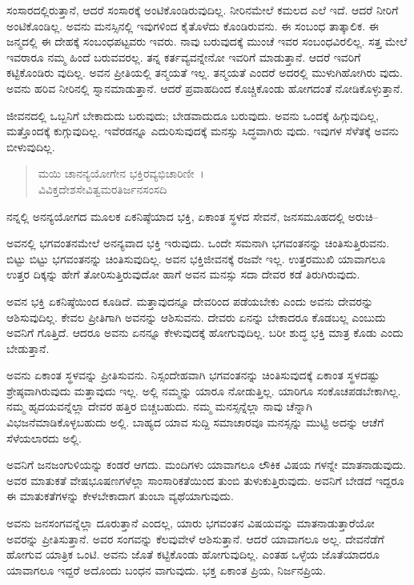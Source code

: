 ಸಂಸಾರದಲ್ಲಿರುತ್ತಾನೆ, ಆದರೆ ಸಂಸಾರಕ್ಕೆ ಅಂಟಿಕೊಂಡಿರುವುದಿಲ್ಲ. ನೀರಿನಮೇಲೆ ಕಮಲದ ಎಲೆ ಇದೆ. ಆದರೆ ನೀರಿಗೆ ಅಂಟಿಕೊಂಡಿಲ್ಲ. ಅವನು ಮನಸ್ಸಿನಲ್ಲಿ ಇವುಗಳಿಂದ ಕೈತೊಳೆದು ಕೊಂಡಿರುವನು. ಈ ಸಂಬಂಧ ತಾತ್ಕಾಲಿಕ. ಈ ಜನ್ಮದಲ್ಲಿ ಈ ದೇಹಕ್ಕೆ ಸಂಬಂಧಪಟ್ಟವರು ಇವರು. ನಾವು ಬರುವುದಕ್ಕೆ ಮುಂಚೆ ಇವರ ಸಂಬಂಧವಿರಲಿಲ್ಲ. ಸತ್ತ ಮೇಲೆ ಇವರಾರೂ ನಮ್ಮ ಹಿಂದೆ ಬರುವವರಲ್ಲ. ತನ್ನ ಕರ್ತವ್ಯವನ್ನೇನೋ ಇವರಿಗೆ ಮಾಡುತ್ತಾನೆ. ಆದರೆ ಇವರಿಗೆ ಕಟ್ಟಿಕೊಂಡಿರು ವುದಿಲ್ಲ. ಅವನ ಪ್ರೀತಿಯಲ್ಲಿ ತನ್ಮಯತೆ ಇಲ್ಲ. ತನ್ಮಯತೆ ಎಂದರೆ ಅದರಲ್ಲಿ ಮುಳುಗಿಹೋಗಿರು ವುದು. ಅವನು ಹರಿವ ನೀರಿನಲ್ಲಿ ಸ್ನಾನಮಾಡುತ್ತಾನೆ. ಆದರೆ ಪ್ರವಾಹದಿಂದ ಕೊಚ್ಚಿಕೊಂಡು ಹೋಗದಂತೆ ನೋಡಿಕೊಳ್ಳುತ್ತಾನೆ.

ಜೀವನದಲ್ಲಿ ಒಬ್ಬನಿಗೆ ಬೇಕಾದುದು ಬರುವುದು; ಬೇಡವಾದುದೂ ಬರುವುದು. ಅವನು ಒಂದಕ್ಕೆ ಹಿಗ್ಗುವುದಿಲ್ಲ, ಮತ್ತೊಂದಕ್ಕೆ ಕುಗ್ಗುವುದಿಲ್ಲ. ಇವೆರಡನ್ನೂ ಎದುರಿಸುವುದಕ್ಕೆ ಮನಸ್ಸು ಸಿದ್ಧವಾಗಿರು ವುದು. ಇವುಗಳ ಸೆಳೆತಕ್ಕೆ ಅವನು ಬೀಳುವುದಿಲ್ಲ.

\begin{verse}
ಮಯಿ ಚಾನನ್ಯಯೋಗೇನ ಭಕ್ತಿರವ್ಯಭಿಚಾರಿಣೀ~।\\ವಿವಿಕ್ತದೇಶಸೇವಿತ್ವಮರತಿರ್ಜನಸಂಸದಿ 
\end{verse}

{\small ನನ್ನಲ್ಲಿ ಅನನ್ಯಯೋಗದ ಮೂಲಕ ಏಕನಿಷ್ಠೆಯಾದ ಭಕ್ತಿ, ಏಕಾಂತ ಸ್ಥಳದ ಸೇವನೆ, ಜನಸಮೂಹದಲ್ಲಿ ಅರುಚಿ–}

ಅವನಲ್ಲಿ ಭಗವಂತನಮೇಲೆ ಅನನ್ಯವಾದ ಭಕ್ತಿ ಇರುವುದು. ಒಂದೇ ಸಮನಾಗಿ ಭಗವಂತನನ್ನು ಚಿಂತಿಸುತ್ತಿರುವನು. ಬಿಟ್ಟು ಬಿಟ್ಟು ಭಗವಂತನನ್ನು ಚಿಂತಿಸುವುದಿಲ್ಲ. ಅವನ ಭಕ್ತಿಜೀವನಕ್ಕೆ ರಜವೇ ಇಲ್ಲ. ಉತ್ತರಮುಖಿ ಯಾವಾಗಲೂ ಉತ್ತರ ದಿಕ್ಕನ್ನು ಹೇಗೆ ತೋರಿಸುತ್ತಿರುವುದೋ ಹಾಗೆ ಅವನ ಮನಸ್ಸು ಸದಾ ದೇವರ ಕಡೆ ತಿರುಗಿರುವುದು.

ಅವನ ಭಕ್ತಿ ಏಕನಿಷ್ಠೆಯಿಂದ ಕೂಡಿದೆ. ಮತ್ತಾವುದನ್ನೂ ದೇವರಿಂದ ಪಡೆಯಬೇಕು ಎಂದು ಅವನು ದೇವರನ್ನು ಆಶಿಸುವುದಿಲ್ಲ. ಕೇವಲ ಪ್ರೀತಿಗಾಗಿ ಅವನನ್ನು ಆಶಿಸುವನು. ದೇವರು ಏನನ್ನು ಬೇಕಾದರೂ ಕೊಡಬಲ್ಲ ಎಂಬುದು ಅವನಿಗೆ ಗೊತ್ತಿದೆ. ಆದರೂ ಅವನು ಏನನ್ನೂ ಕೇಳುವುದಕ್ಕೆ ಹೋಗುವುದಿಲ್ಲ. ಬರೀ ಶುದ್ಧ ಭಕ್ತಿ ಮಾತ್ರ ಕೊಡು ಎಂದು ಬೇಡುತ್ತಾನೆ.

ಅವನು ಏಕಾಂತ ಸ್ಥಳವನ್ನು ಪ್ರೀತಿಸುವನು. ನಿಸ್ಸಂದೇಹವಾಗಿ ಭಗವಂತನನ್ನು ಚಿಂತಿಸುವುದಕ್ಕೆ ಏಕಾಂತ ಸ್ಥಳದಷ್ಟು ಶ್ರೇಷ್ಠವಾಗಿರುವುದು ಮತ್ತಾವುದು ಇಲ್ಲ. ಅಲ್ಲಿ ನಮ್ಮನ್ನು ಯಾರೂ ನೋಡುತ್ತಿಲ್ಲ. ಯಾರಿಗೂ ಸಂಕೊಚಪಡಬೇಕಾಗಿಲ್ಲ. ನಮ್ಮ ಹೃದಯವನ್ನೆಲ್ಲಾ ದೇವರ ಹತ್ತಿರ ಬಿಚ್ಚಬಹುದು. ನಮ್ಮ ಮನಸ್ಸನ್ನೆಲ್ಲಾ ನಾವು ಚೆನ್ನಾಗಿ ವಿಭಜನೆಮಾಡಿಕೊಳ್ಳಬಹುದು ಅಲ್ಲಿ. ಬಾಹ್ಯದ ಯಾವ ಸುದ್ದಿ ಸಮಾಚಾರವೂ ಮನಸ್ಸನ್ನು ಮುಟ್ಟಿ ಅದನ್ನು ಆಚೆಗೆ ಸೆಳೆಯಲಾರದು ಅಲ್ಲಿ.

ಅವನಿಗೆ ಜನಜಂಗುಳಿಯನ್ನು ಕಂಡರೆ ಆಗದು. ಮಂದಿಗಳು ಯಾವಾಗಲೂ ಲೌಕಿಕ ವಿಷಯ ಗಳನ್ನೇ ಮಾತನಾಡುವುದು. ಅವರ ಮಾತುಕತೆ ವೇಷಭೂಷಣಗಳೆಲ್ಲಾ ಸಾಂಸಾರಿಕತೆಯಿಂದ ತುಂಬಿ ತುಳುಕುತ್ತಿರುವುದು. ಅವನಿಗೆ ಬೇಡದೆ ಇದ್ದರೂ ಈ ಮಾತುಕತೆಗಳನ್ನು ಕೇಳಬೇಕಾದಾಗ ತುಂಬಾ ವ್ಯಥೆಯಾಗುವುದು.

ಅವನು ಜನಸಂಗವನ್ನೆಲ್ಲಾ ದೂರುತ್ತಾನೆ ಎಂದಲ್ಲ, ಯಾರು ಭಗವಂತನ ವಿಷಯವನ್ನು ಮಾತನಾಡುತ್ತಾರೆಯೋ ಅವರನ್ನು ಪ್ರೀತಿಸುತ್ತಾನೆ. ಅವರ ಸಂಗವನ್ನು ಕೆಲವುವೇಳೆ ಆಶಿಸುತ್ತಾನೆ. ಆದರೆ ಯಾವಾಗಲೂ ಅಲ್ಲ. ದೇವನೆಡೆಗೆ ಹೋಗುವ ಯಾತ್ರಿಕ ಒಂಟಿ. ಅವನು ಜೊತೆ ಕಟ್ಟಿಕೊಂಡು ಹೋಗುವುದಿಲ್ಲ. ಎಂತಹ ಒಳ್ಳೆಯ ಜೊತೆಯಾದರೂ ಯಾವಾಗಲೂ ಇದ್ದರೆ ಅದೊಂದು ಬಂಧನ ವಾಗುವುದು. ಭಕ್ತ ಏಕಾಂತ ಪ್ರಿಯ, ನಿರ್ಜನಪ್ರಿಯ.\enginline{}


